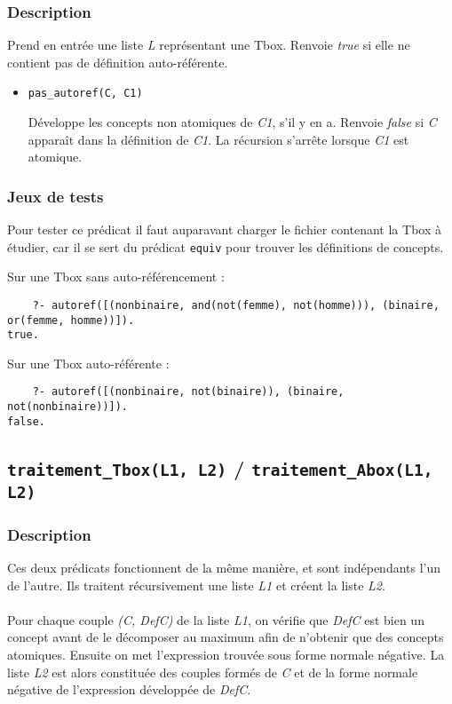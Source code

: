 \documentclass{article}
\newcommand{\code}[1]{\colorbox{light-gray}{\texttt{#1}}}
\begin{document}
\subsubsection{Description}
Prend en entrée une liste \textit{L} représentant une Tbox. Renvoie \textit{true} si elle ne contient pas de définition auto-référente.

\begin{itemize}

    \item \code{pas\_autoref(C, C1)}

    Développe les concepts non atomiques de \textit{C1}, s'il y en a. Renvoie \textit{false} si \textit{C} apparaît dans la définition de \textit{C1}. La récursion s'arrête lorsque \textit{C1} est atomique.
\end{itemize}

\subsubsection{Jeux de tests}
Pour tester ce prédicat il faut auparavant charger le fichier contenant la Tbox à étudier, car il se sert du prédicat \code{equiv} pour trouver les définitions de concepts.

Sur une Tbox sans auto-référencement :
\begin{verbatim}
    ?- autoref([(nonbinaire, and(not(femme), not(homme))), (binaire, or(femme, homme))]).
true.
\end{verbatim}

Sur une Tbox auto-référente : 
\begin{verbatim}
    ?- autoref([(nonbinaire, not(binaire)), (binaire, not(nonbinaire))]).
false.
\end{verbatim}


\subsection{\code{traitement\_Tbox(L1, L2)} / \code{traitement\_Abox(L1, L2)}}
\subsubsection{Description}

Ces deux prédicats fonctionnent de la même manière, et sont indépendants l'un de l'autre. Ils traitent récursivement une liste \textit{L1} et créent la liste \textit{L2}.
\\\\
Pour chaque couple \textit{(C, DefC)} de la liste \textit{L1}, on vérifie que \textit{DefC} est bien un concept avant de le décomposer au maximum afin de n'obtenir que des concepts atomiques. Ensuite on met l'expression trouvée sous forme normale négative. La liste \textit{L2} est alors constituée des couples formés de \textit{C} et de la forme normale négative de l'expression développée de \textit{DefC}.
\end{document}
